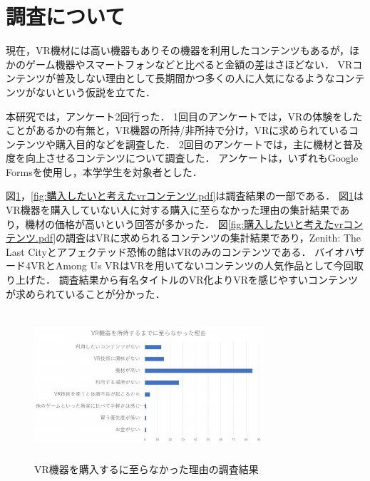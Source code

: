 \documentclass[twocolumn,10pt,a4j]{ltjsarticle}
\begin{document}



\section{調査について}
現在，VR機材には高い機器もありその機器を利用したコンテンツもあるが，ほかのゲーム機器やスマートフォンなどと比べると金額の差はさほどない．
VRコンテンツが普及しない理由として長期間かつ多くの人に人気になるようなコンテンツがないという仮説を立てた．

本研究では，アンケート2回行った．
1回目のアンケートでは，VRの体験をしたことがあるかの有無と，VR機器の所持/非所持で分け，VRに求められているコンテンツや購入目的などを調査した．
2回目のアンケートでは，主に機材と普及度を向上させるコンテンツについて調査した．
アンケートは，いずれもGoogle Formsを使用し，本学学生を対象者とした．

図\ref{fig:vr機器を所持するまでに至らなかった理由.pdf}，\ref{fig:購入したいと考えたvrコンテンツ.pdf}は調査結果の一部である．
図\ref{fig:vr機器を所持するまでに至らなかった理由.pdf}はVR機器を購入していない人に対する購入に至らなかった理由の集計結果であり，機材の価格が高いという回答が多かった．
図\ref{fig:購入したいと考えたvrコンテンツ.pdf}の調査はVRに求められるコンテンツの集計結果であり，Zenith: The Last Cityとアフェクテッド恐怖の館はVRのみのコンテンツである．
バイオハザード4VRとAmong Us VRはVRを用いてないコンテンツの人気作品として今回取り上げた．
調査結果から有名タイトルのVR化よりVRを感じやすいコンテンツが求められていることが分かった．

\begin{figure}[h]
\begin{center}
 \includegraphics[clip,width=85mm,height=55mm]{vr機器を所持するまでに至らなかった理由.pdf}
\end{center}
 \caption{VR機器を購入するに至らなかった理由の調査結果}
 \label{fig:vr機器を所持するまでに至らなかった理由.pdf}
\end{figure}
\vspace{2mm}
\end{document}
